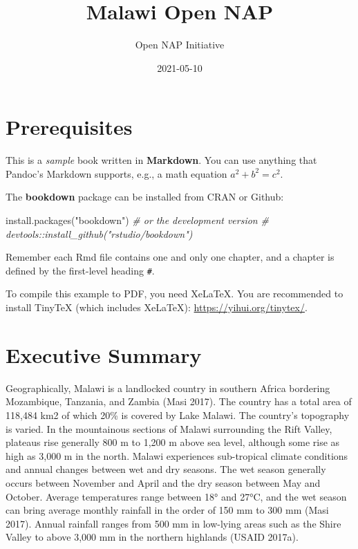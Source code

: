 \documentclass[
]{book}
\title{Malawi Open NAP}
\author{Open NAP Initiative}
\date{2021-05-10}
\newenvironment{Shaded}{\begin{snugshade}}{\end{snugshade}}
\newcommand{\CommentTok}[1]{\textcolor[rgb]{0.56,0.35,0.01}{\textit{#1}}}
\newcommand{\FunctionTok}[1]{\textcolor[rgb]{0.00,0.00,0.00}{#1}}
\newcommand{\NormalTok}[1]{#1}
\newcommand{\StringTok}[1]{\textcolor[rgb]{0.31,0.60,0.02}{#1}}
\begin{document}
\maketitle

{
\setcounter{tocdepth}{1}
\tableofcontents
}
\hypertarget{prerequisites}{%
\chapter{Prerequisites}\label{prerequisites}}

This is a \emph{sample} book written in \textbf{Markdown}. You can use anything that Pandoc's Markdown supports, e.g., a math equation \(a^2 + b^2 = c^2\).

The \textbf{bookdown} package can be installed from CRAN or Github:

\begin{Shaded}
\begin{Highlighting}[]
\FunctionTok{install.packages}\NormalTok{(}\StringTok{"bookdown"}\NormalTok{)}
\CommentTok{\# or the development version}
\CommentTok{\# devtools::install\_github("rstudio/bookdown")}
\end{Highlighting}
\end{Shaded}

Remember each Rmd file contains one and only one chapter, and a chapter is defined by the first-level heading \texttt{\#}.

To compile this example to PDF, you need XeLaTeX. You are recommended to install TinyTeX (which includes XeLaTeX): \url{https://yihui.org/tinytex/}.

\hypertarget{executive-summary}{%
\chapter{Executive Summary}\label{executive-summary}}

Geographically, Malawi is a landlocked country in southern Africa bordering Mozambique, Tanzania, and Zambia (Masi 2017). The country has a total area of 118,484
km2 of which 20\% is covered by Lake Malawi. The country's topography is varied. In the mountainous sections of Malawi surrounding the Rift Valley, plateaus rise
generally 800 m to 1,200 m above sea level, although some rise as high as 3,000 m in the north. Malawi experiences sub-tropical climate conditions and annual
changes between wet and dry seasons. The wet season generally occurs between November and April and the dry season between May and October. Average temperatures
range between 18° and 27°C, and the wet season can bring average monthly rainfall in the order of 150 mm to 300 mm (Masi 2017). Annual rainfall ranges from 500 mm
in low-lying areas such as the Shire Valley to above 3,000 mm in the northern highlands (USAID 2017a).
\end{document}
